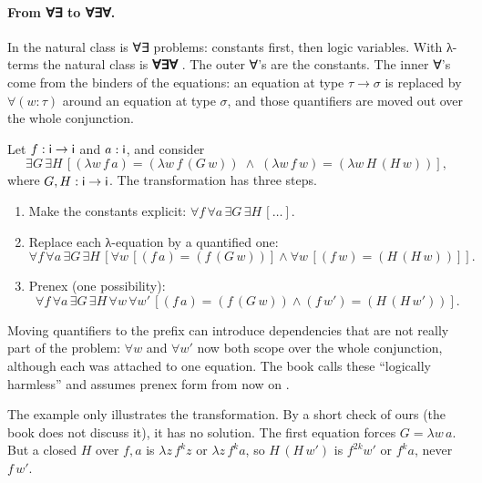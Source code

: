 {\paragraph{From ∀∃ to ∀∃∀.} In \fohc{} the natural class is ∀∃ problems: constants first, then logic
variables. With λ-terms the natural class is \textbf{∀∃∀} . The outer ∀'s are the
constants. The inner ∀'s come from the binders of the equations: an equation at type $\tau\to\sigma$
is replaced by $\forall(w{:}\tau)$ around an equation at type $\sigma$, and those quantifiers are moved
out over the whole conjunction.

\begin{example}\label{ex:lambda-prenex}
Let $f:\mathsf{i}\to\mathsf{i}$ and $a:\mathsf{i}$, and consider
\[
  \exists G\,\exists H\,[(\lambda w\,f\,a)=(\lambda w\,f\,(G\,w))\;\wedge\;(\lambda w\,f\,w)=(\lambda w\,H\,(H\,w))],
\]
where $G,H:\mathsf{i}\to\mathsf{i}$. The transformation has three steps.
\begin{enumerate}[nosep]
\item Make the constants explicit:
  $\forall f\,\forall a\,\exists G\,\exists H\,[\dots]$.
\item Replace each λ-equation by a quantified one:
  \[\forall f\,\forall a\,\exists G\,\exists H\,[\forall w\,[(f\,a)=(f\,(G\,w))]\wedge\forall w\,[(f\,w)=(H\,(H\,w))]].\]
\item Prenex (one possibility):
  \[\forall f\,\forall a\,\exists G\,\exists H\,\forall w\,\forall w'\,[(f\,a)=(f\,(G\,w))\wedge(f\,w')=(H\,(H\,w'))].\]
\end{enumerate}
Moving quantifiers to the prefix can introduce dependencies that are not really part of the problem:
$\forall w$ and $\forall w'$ now both scope over the whole conjunction, although each was attached to one equation. The book calls these \enquote{logically harmless}
and assumes prenex form from now on .
\end{example}
The example only illustrates the transformation. By a short check of ours (the book does not
discuss it), it has no solution. The first equation forces $G=\lambda w\,a$. But a closed $H$ over
$f,a$ is $\lambda z\,f^k z$ or $\lambda z\,f^k a$, so $H\,(H\,w')$ is $f^{2k}w'$ or $f^k a$, never $f\,w'$.

}
